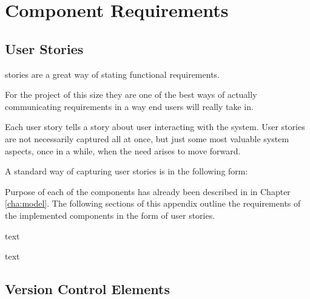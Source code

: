 \chapter{Component Requirements \label{app:specification}}

\section{User Stories}

stories are a great way of stating functional requirements.

For the project of this size they are one of the best ways of actually
communicating requirements in a way end users will really take in.

Each user story tells a story about user interacting with the system. User
stories are not necessarily captured all at once, but just some most valuable
system aspects, once in a while, when the need arises to move forward.

A standard way of capturing user stories is in the following form:


Purpose of each of the components has already been described in in Chapter
\ref{cha:model}. The following sections of this appendix outline the
requirements of the implemented components in the form of user stories.

text

text

\section{Version Control Elements}

